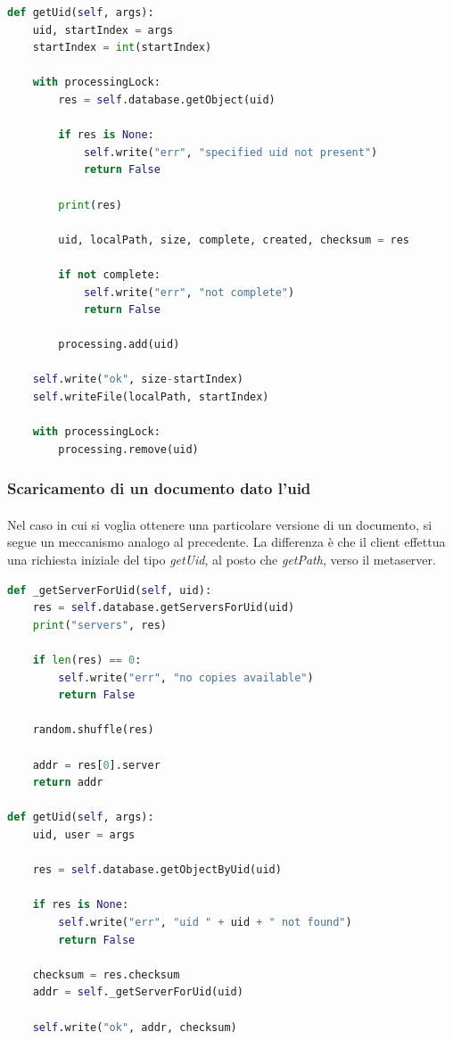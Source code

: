 \documentclass[11pt,a4paper,english]{article}
\begin{document}
\begin{lstlisting}[language=Python, title=Codice]
def getUid(self, args):
    uid, startIndex = args
    startIndex = int(startIndex)

    with processingLock:
        res = self.database.getObject(uid)

        if res is None:
            self.write("err", "specified uid not present")
            return False

        print(res)

        uid, localPath, size, complete, created, checksum = res

        if not complete:
            self.write("err", "not complete")
            return False

        processing.add(uid)

    self.write("ok", size-startIndex)
    self.writeFile(localPath, startIndex)

    with processingLock:
        processing.remove(uid)
\end{lstlisting}

\subsubsection{Scaricamento di un documento dato l'uid}

\paragraph{} Nel caso in cui si voglia ottenere una particolare versione di un documento, si segue un meccanismo analogo al precedente. La differenza è che il client effettua una richiesta iniziale del tipo \emph{getUid}, al posto che \emph{getPath}, verso il metaserver. 

\begin{lstlisting}[language=Python, title=Metaserver]
def _getServerForUid(self, uid):
    res = self.database.getServersForUid(uid)
    print("servers", res)

    if len(res) == 0:
        self.write("err", "no copies available")
        return False

    random.shuffle(res)

    addr = res[0].server
    return addr

def getUid(self, args):
    uid, user = args

    res = self.database.getObjectByUid(uid)

    if res is None:
        self.write("err", "uid " + uid + " not found")
        return False

    checksum = res.checksum
    addr = self._getServerForUid(uid)

    self.write("ok", addr, checksum)
\end{lstlisting}
\end{document}

